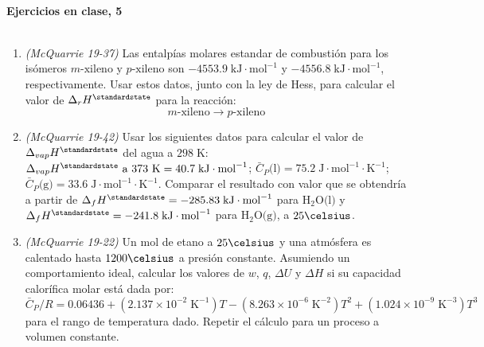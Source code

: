 \documentclass[a4paper,12pt]{article}
\begin{document}

\begin{center}
\HRule \\[0.4cm]
{ \bfseries Ejercicios en clase, 5}\\ %
\HRule \\[0.4cm]
\end{center}


\begin{enumerate}

 \item \textit{(McQuarrie 19-37)} Las entalp\'ias molares estandar de combusti\'on para los is\'omeros $m\mbox{-xileno}$ y $p\mbox{-xileno}$ son $-4553.9\;\mbox{kJ}\cdot\mbox{mol}^{-1}$ y $-4556.8\;\mbox{kJ}\cdot\mbox{mol}^{-1}$, respectivamente. Usar estos datos, junto con la ley de Hess, para calcular el valor de $\Delta_rH^\standardstate$ para la reacci\'on:
$$m\mbox{-xileno}\rightarrow p\mbox{-xileno}$$ %

 \item \textit{(McQuarrie 19-42)} Usar los siguientes datos para calcular el valor de $\Delta_{vap}H^\standardstate$ del agua a $298\;\mbox{K}$: $\Delta_{vap}H^\standardstate\mbox{ a 373 K}=40.7\;\mbox{kJ}\cdot\mbox{mol}^{-1}$; $\bar{C}_P\mbox{(l)}=75.2\;\mbox{J}\cdot\mbox{mol}^{-1}\cdot\mbox{K}^{-1}$; $\bar{C}_P\mbox{(g)}=33.6\;\mbox{J}\cdot\mbox{mol}^{-1}\cdot\mbox{K}^{-1}$. Comparar el resultado con valor que se obtendr\'ia a partir de $\Delta_{f}H^\standardstate=-285.83\;\mbox{kJ}\cdot\mbox{mol}^{-1}$ para $\mbox{H}_2\mbox{O(l)}$ y $\Delta_{f}H^\standardstate=-241.8\;\mbox{kJ}\cdot\mbox{mol}^{-1}$ para $\mbox{H}_2\mbox{O(g)}$, a $25\celsius$. %

 \item \textit{(McQuarrie 19-22)} Un mol de etano a $25\celsius$ y una atm\'osfera es calentado hasta $1200\celsius$ a presi\'on constante. Asumiendo un comportamiento ideal, calcular los valores de $w$, $q$, $\Delta U$ y $\Delta H$ si su capacidad calor\'ifica molar est\'a dada por:
$$\bar{C}_P/R=0.06436+(2.137\times 10^{-2}\;\mbox{K}^{-1})T-(8.263\times 10^{-6}\;\mbox{K}^{-2})T^2+(1.024\times 10^{-9}\;\mbox{K}^{-3})T^3$$
para el rango de temperatura dado. Repetir el c\'alculo para un proceso a volumen constante. %


\end{enumerate}
\end{document}
